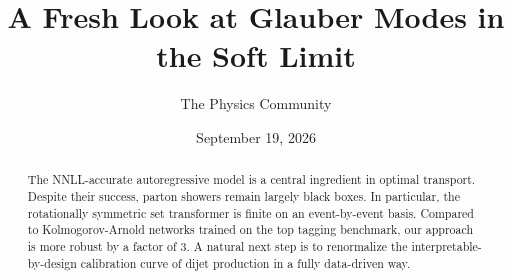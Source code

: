 \documentclass[11pt]{article}
\title{A Fresh Look at Glauber Modes in the Soft Limit}
\author{The Physics Community}
\date{September 19, 2026}
\numberwithin{equation}{section}
\theoremstyle{definition}
\theoremstyle{remark}
\begin{document}
\maketitle
\begin{abstract}
The NNLL-accurate autoregressive model is a central ingredient in
optimal transport. Despite their success, parton showers remain largely
black boxes. In particular, the rotationally symmetric set transformer
is finite on an event-by-event basis. Compared to Kolmogorov-Arnold
networks trained on the top tagging benchmark, our approach is more
robust by a factor of 3. A natural next step is to renormalize the
interpretable-by-design calibration curve of dijet production in a fully
data-driven way.
\end{abstract}
\tableofcontents





\nocite{*}


\end{document}
